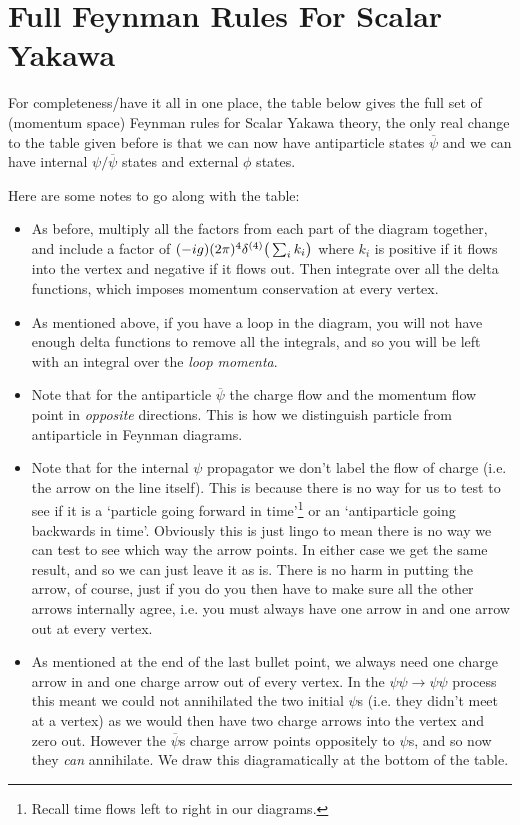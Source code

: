 \section{Full Feynman Rules For Scalar Yakawa}

For completeness/have it all in one place, the table below gives the full set of (momentum space) Feynman rules for Scalar Yakawa theory, the only real change to the table given before is that we can now have antiparticle states $\overline{\psi}$ and we can have internal $\psi/\overline{\psi}$ states and external $\phi$ states. 

Here are some notes to go along with the table:
\begin{itemize}
    \item As before, multiply all the factors from each part of the diagram together, and include a factor of $(-ig)(2\pi)^4\delta^{(4)}\big(\sum_ik_i\big)$ where $k_i$ is positive if it flows into the vertex and negative if it flows out. Then integrate over all the delta functions, which imposes momentum conservation at every vertex. 
    \item As mentioned above, if you have a loop in the diagram, you will not have enough delta functions to remove all the integrals, and so you will be left with an integral over the \textit{loop momenta}. 
    \item Note that for the antiparticle $\overline{\psi}$ the charge flow and the momentum flow point in \textit{opposite} directions. This is how we distinguish particle from antiparticle in Feynman diagrams.
    \item Note that for the internal $\psi$ propagator we don't label the flow of charge (i.e. the arrow on the line itself). This is because there is no way for us to test to see if it is a `particle going forward in time'\footnote{Recall time flows left to right in our diagrams.} or an `antiparticle going backwards in time'. Obviously this is just lingo to mean there is no way we can test to see which way the arrow points. In either case we get the same result, and so we can just leave it as is. There is no harm in putting the arrow, of course, just if you do you then have to make sure all the other arrows internally agree, i.e. you must always have one arrow in and one arrow out at every vertex.
    \item As mentioned at the end of the last bullet point, we always need one charge arrow in and one charge arrow out of every vertex. In the $\psi\psi\to\psi\psi$ process this meant we could not annihilated the two initial $\psi$s (i.e. they didn't meet at a vertex) as we would then have two charge arrows into the vertex and zero out. However the $\overline{\psi}$s charge arrow points oppositely to $\psi$s, and so now they \textit{can} annihilate. We draw this diagramatically at the bottom of the table. 
\end{itemize}

